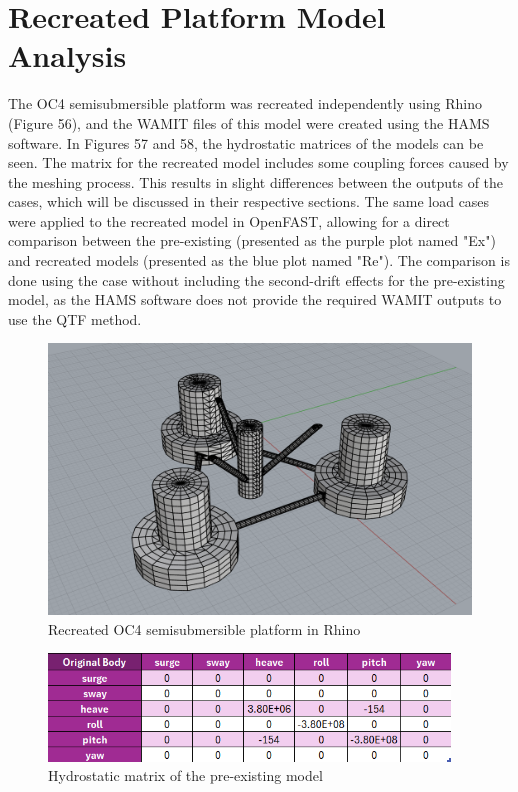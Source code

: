 \documentclass[a4paper, 11pt]{article}
\begin{document}
\newpage
\section{Recreated Platform Model Analysis}

\hspace*{0.5cm}The OC4 semisubmersible platform was recreated independently using Rhino (Figure 56), and the WAMIT files of this model were created using the HAMS software. In Figures 57 and 58, the hydrostatic matrices of the models can be seen. The matrix for the recreated model includes some coupling forces caused by the meshing process. This results in slight differences between the outputs of the cases, which will be discussed in their respective sections. The same load cases were applied to the recreated model in OpenFAST, allowing for a direct comparison between the pre-existing (presented as the purple plot named "Ex") and recreated models (presented as the blue plot named "Re"). The comparison is done using the case without including the second-drift effects for the pre-existing model, as the HAMS software does not provide the required WAMIT outputs to use the QTF method.

\begin{figure}[H]
    \centering
    \includegraphics[width=1\textwidth]{rhino.png}
    \caption{\small Recreated OC4 semisubmersible platform in Rhino}
    \label{fig:rhino}
\end{figure}

\begin{figure}[H]
    \centering
    \includegraphics[width=0.95\textwidth]{hyd_st_org.png}
    \caption{\small Hydrostatic matrix of the pre-existing model}
    \label{fig:hyd_st_org}
\end{figure}
\end{document}
